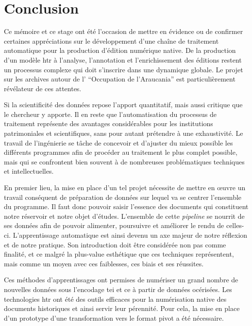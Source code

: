 \chapter*{Conclusion}

Ce mémoire et ce stage ont été l'occasion de mettre en évidence ou de confirmer certaines appréciations sur le développement d'une chaîne de traitement automatique pour la production d'édition numérique native. De la production d'un modèle \gls{htr} à l'analyse, l'annotation et l'enrichissement des éditions restent un processus complexe qui doit s'inscrire dans une dynamique globale. Le projet sur les archives autour de l' \enquote{Occupation de l'Araucania} est particulièrement révélateur de ces attentes.

Si la scientificité des données repose l'apport quantitatif, mais aussi critique que le chercheur y apporte. Il en reste que l'automatisation du processus de traitement représente des avantages considérables pour les institutions patrimoniales et scientifiques, sans pour autant prétendre à une exhaustivité. Le travail de l'ingénierie se tâche de concevoir et d'ajuster du mieux possible les différents programmes afin de procéder au traitement le plus complet possible, mais qui se confrontent bien souvent à de nombreuses problématiques techniques et intellectuelles.\newpar

En premier lieu, la mise en place d'un tel projet nécessite de mettre en œuvre un travail conséquent de préparation de données sur lequel va se centrer l'ensemble du programme. Il faut donc pouvoir saisir l'essence des documents qui constituent notre réservoir et notre objet d'études. L'ensemble de cette \textit{pipeline} se nourrit de ses données afin de pouvoir alimenter, poursuivre et améliorer le rendu de celles-ci. L'apprentissage automatique est ainsi devenu un axe majeur de notre réflexion et de notre pratique. Son introduction doit être considérée non pas comme finalité, et ce malgré la plus-value esthétique que ces techniques représentent, mais comme un moyen avec ces faiblesses, ces biais et ses réussites.

Ces méthodes d’apprentissages ont permises de numériser un grand nombre de nouvelles données sous l'encodage \gls{tei} et ce à partir de données océrisées. Les technologies \gls{htr} ont été des outils efficaces pour la numérisation native des documents historiques et ainsi servir leur pérennité. Pour cela, la mise en place d'un prototype d'une transformation vers le format pivot a été nécessaire.

